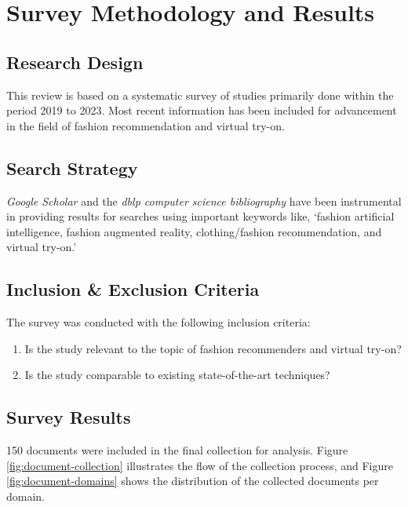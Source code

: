 \section{\textbf{Survey Methodology and Results}} \label{section:survey-methodology}
	\subsection{\textbf{Research Design}}
		This review is based on a systematic survey of studies primarily done within the period 2019 to 2023. Most recent information has been included for advancement in the field of fashion recommendation and virtual try-on.

	\subsection{\textbf{Search Strategy}}
		\textit{Google Scholar} and the \textit{dblp computer science bibliography} have been instrumental in providing results for searches using important keywords like, `fashion artificial intelligence, fashion augmented reality, clothing/fashion recommendation, and virtual try-on.'

	\subsection{\textbf{Inclusion \& Exclusion Criteria}}
		The survey was conducted with the following inclusion criteria:
		\begin{enumerate}
			\item Is the study relevant to the topic of fashion recommenders and virtual try-on?
			\item Is the study comparable to existing state-of-the-art techniques?
		\end{enumerate}

	\subsection{\textbf{Survey Results}}
		150 documents were included in the final collection for analysis. Figure \ref{fig:document-collection} illustrates the flow of the collection process, and Figure \ref{fig:document-domains} shows the distribution of the collected documents per domain.


